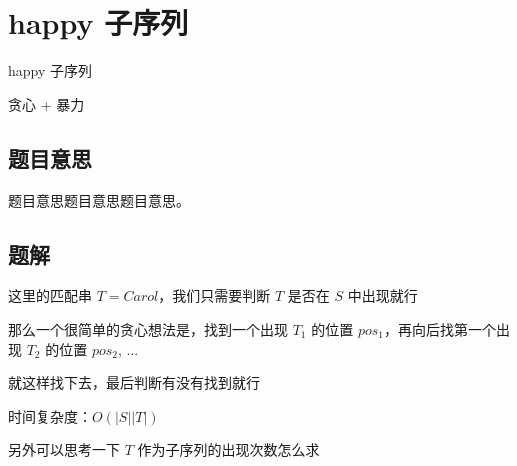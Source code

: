 \def\sectionName{happy 子序列}
\section{\sectionName}



\begin{frame}

\isBeamerMode\relax
    {\Huge \sectionName}\par
\fi




贪心 + 暴力



\end{frame}

\subsection{题目意思}
\begin{frame} %
题目意思题目意思题目意思。
\end{frame}



\subsection{题解}
\begin{frame} %

这里的匹配串 $T = Carol$，我们只需要判断 $T$ 是否在 $S$ 中出现就行

那么一个很简单的贪心想法是，找到一个出现 $T_1$ 的位置 $pos_1$，再向后找第一个出现 $T_2$ 的位置 $pos_2$, ...

就这样找下去，最后判断有没有找到就行

时间复杂度：$O(|S||T|)$  

另外可以思考一下 $T$ 作为子序列的出现次数怎么求

\end{frame}
